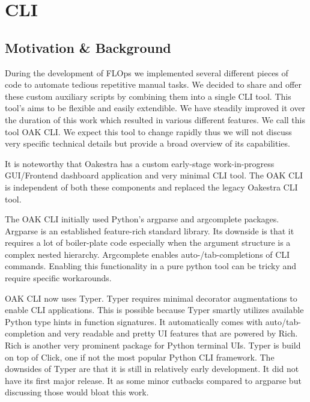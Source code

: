 \section{CLI}

\subsection{Motivation \& Background}

During the development of FLOps we implemented several different pieces of code to automate tedious repetitive manual tasks.
We decided to share and offer these custom auxiliary scripts by combining them into a single CLI tool.
This tool's aims to be flexible and easily extendible.
We have steadily improved it over the duration of this work which resulted in various different features.
We call this tool OAK CLI.
We expect this tool to change rapidly thus we will not discuss very specific technical details but provide a broad overview of its capabilities.

It is noteworthy that Oakestra has a custom early-stage work-in-progress GUI/Frontend dashboard application and very minimal CLI tool.
The OAK CLI is independent of both these components and replaced the legacy Oakestra CLI tool.

The OAK CLI initially used Python's argparse and argcomplete packages.
Argparse is an established feature-rich standard library.
Its downside is that it requires a lot of boiler-plate code especially when the argument structure is a complex nested hierarchy.
Argcomplete enables auto-/tab-completions of CLI commands.
Enabling this functionality in a pure python tool can be tricky and require specific workarounds.

OAK CLI now uses Typer.
Typer requires minimal decorator augmentations to enable CLI applications.
This is possible because Typer smartly utilizes available Python type hints in function signatures.
It automatically comes with auto/tab-completion and very readable and pretty UI features that are powered by Rich.
Rich is another very prominent package for Python terminal UIs.
Typer is build on top of Click, one if not the most popular Python CLI framework.
The downsides of Typer are that it is still in relatively early development.
It did not have its first major release.
It as some minor cutbacks compared to argparse but discussing those would bloat this work.

